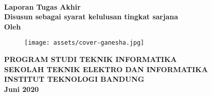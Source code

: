 \clearpage
\pagestyle{empty}


{\selectfont%
	\begin{center}

		\smallskip

		\large{\bfseries \MakeUppercase{\thetitle}}
		\\[2\baselineskip]

		\large{\bfseries Laporan Tugas Akhir}
		\\[\baselineskip]

		\normalsize{ \bfseries
			Disusun sebagai syarat kelulusan tingkat sarjana
		}
		\\[3\baselineskip]

		\normalsize{ \bfseries Oleh\\}
		\large{ \bfseries \MakeUppercase{\theauthor}}

		\vfill
		\begin{figure}[h]
			\centering
			\texttt{[image: assets/cover-ganesha.jpg]}
		\end{figure}
		\vfill

		\large{ \bfseries
			\uppercase{
				Program Studi Teknik Informatika \\
				Sekolah Teknik Elektro dan Informatika \\
				Institut Teknologi Bandung\\
			}
			Juni 2020
		}

	\end{center}
}%

\restoregeometry
\clearpage

